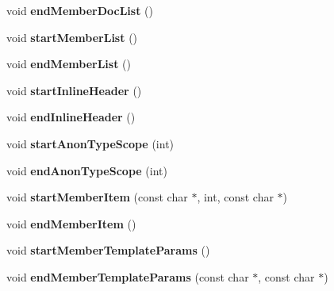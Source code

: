 \begin{DoxyCompactItemize}
void {\bfseries end\+Member\+Doc\+List} ()
\item 
\mbox{\label{class_latex_generator_a8c936a9bdcd8c892387318b3f947fb1e}} 
void {\bfseries start\+Member\+List} ()
\item 
\mbox{\label{class_latex_generator_ae48dfc57c572fe5004850c809697f1c7}} 
void {\bfseries end\+Member\+List} ()
\item 
\mbox{\label{class_latex_generator_a4f882c4c4f0b324aa4e8b90a3669f4e3}} 
void {\bfseries start\+Inline\+Header} ()
\item 
\mbox{\label{class_latex_generator_acdfb80dc630e5257ba36c40a3a9e8c06}} 
void {\bfseries end\+Inline\+Header} ()
\item 
\mbox{\label{class_latex_generator_a320eca9524c1041ffffcffc5784d2272}} 
void {\bfseries start\+Anon\+Type\+Scope} (int)
\item 
\mbox{\label{class_latex_generator_a1f90504c74c14b0632ed5bf2bb4ef029}} 
void {\bfseries end\+Anon\+Type\+Scope} (int)
\item 
\mbox{\label{class_latex_generator_acf2b05084bb0905ea84c4bfcc634cbee}} 
void {\bfseries start\+Member\+Item} (const char $\ast$, int, const char $\ast$)
\item 
\mbox{\label{class_latex_generator_abc987c69dce26f3ae3b8b10aeb4e4ce6}} 
void {\bfseries end\+Member\+Item} ()
\item 
\mbox{\label{class_latex_generator_ab5f3a94b36ee1eb5086432b5dd6d2f26}} 
void {\bfseries start\+Member\+Template\+Params} ()
\item 
\mbox{\label{class_latex_generator_a3911278e93403187061551fb65a14910}} 
void {\bfseries end\+Member\+Template\+Params} (const char $\ast$, const char $\ast$)
\item 
\mbox{\label{class_latex_generator_a82e907a0ee2aaaf3ef300d8b2314bacc}} 

\end{DoxyCompactItemize}
